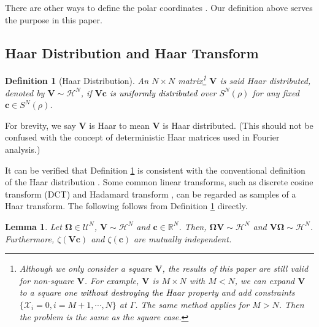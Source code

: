 \documentclass[journal]{IEEEtran}
\renewcommand{\bf}{\bm}
\newcommand{\bb}{\mathbb}
\renewcommand{\cal}{\mathcal}
\newtheorem{definition}[theorem]{Definition}
\newtheorem{lemma}[theorem]{Lemma}
\newcommand{\LL}[1]{\textcolor{black}{#1}}
\begin{document}
There are other ways to define the polar coordinates \cite{Bronshtein2004}. Our definition above serves the purpose in this paper. 
 



 \subsection{Haar Distribution and Haar Transform}  

 

 \begin{definition}[Haar Distribution]\label{Def:Haar}
An $N\times N$ matrix\footnote{Although we only consider a square $\bf{V}$, the results of this paper are still valid for non-square $\bf{V}$. For example, $\bf{V}$ is $M\times N$ with $M<N$, we can expand $\bf{V}$ to a square one \LL{without destroying the Haar} property and add constraints $\{{\mathcal{X}}_i=0, i=M+1,\cdots,N\}$ at $\Gamma$. The same method applies for $M>N$. Then the problem is the same as the square case.} $\bf{V}$ is said Haar distributed, denoted by $\bf{V}\sim \bf{\cal{H}}^N$, if $\bf{Vc}$ \LL{is uniformly distributed} over $S^N(\rho)$ for any fixed $\bf{c}\in S^N(\rho)$.  %
\end{definition} 

For brevity, we say $\bf{V}$ is Haar to mean $\bf{V}$ is Haar distributed. (This should not be confused with the concept of deterministic Haar matrices used in Fourier analysis.) 

It can be verified that Definition \ref{Def:Haar} is consistent with the conventional definition of the Haar distribution \cite{Tulino2004}. Some common linear transforms, such as discrete cosine transform (DCT) \cite{Ahmed1974}  and Hadamard transform \cite{Yarlagadda1997}, can be regarded as samples of a Haar transform. The following follows from Definition \ref{Def:Haar}  directly. 

\begin{lemma}
    Let $\bf{\Omega}\in \bf{\cal{U}}^N$, $\bf{V}\sim \bf{\cal{H}}^N$ and $\bf{c}\in \bb{R}^N$. Then,  $\bf{\Omega V}\sim \bf{\cal{H}}^N$ and $\bf{V\Omega}\sim \bf{\cal{H}}^N$. Furthermore, $\zeta(\bf{Vc})$ and $\zeta(\bf{c})$ are mutually independent.
\end{lemma}
\end{document}
